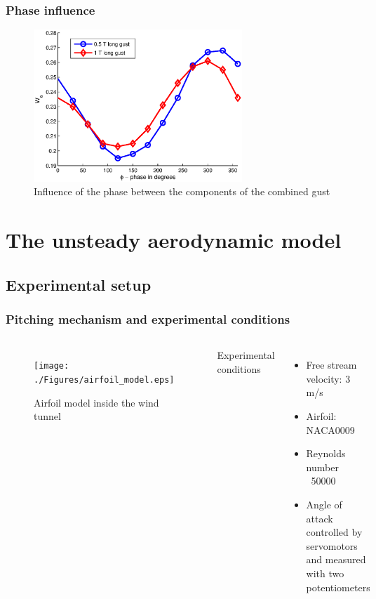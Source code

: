 \documentclass[compress]{beamer}
\begin{document}
\begin{frame}
  \frametitle{Phase influence}
\begin{figure}[ht]
  \begin{center}
    \includegraphics[width=0.7\textwidth]{./Figures/combined_gust_amplitude_vs_phase_LUT.eps}
  \end{center}
  \caption{Influence of the phase between the components of the combined gust}
  \label{fig:combined_amplitude_phase}
\end{figure}
\end{frame}


\section[GK model]{The unsteady aerodynamic model}

\subsection{Experimental setup}

\begin{frame}
  \frametitle{Pitching mechanism and experimental conditions}
  \begin{columns}
    \begin{figure}[h]
      \begin{center}
	\texttt{[image: ./Figures/airfoil\_model.eps]}
      \end{center}
      \caption{Airfoil model inside the wind tunnel}
    \end{figure}
    Experimental conditions
    \begin{itemize}
      \item Free stream velocity: 3 m/s
      \item Airfoil: NACA0009
      \item Reynolds number ~50000
      \item Angle of attack controlled by servomotors and measured with two potentiometers
    \end{itemize}
  \end{columns}
\end{frame}
\end{document}
